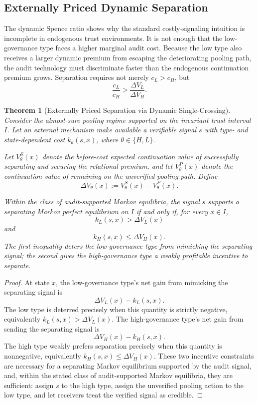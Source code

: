 \documentclass[preprint,authoryear]{elsarticle}
\newtheorem{theorem}{Theorem}
\theoremstyle{definition}
\theoremstyle{plain}
\begin{document}
\subsection{Externally Priced Dynamic Separation}
\label{subsec:dynamic-separation}

The dynamic Spence ratio shows why the standard costly-signaling intuition is
incomplete in endogenous trust environments.  It is not enough that the
low-governance type faces a higher marginal audit cost.  Because the low type
also receives a larger dynamic premium from escaping the deteriorating pooling
path, the audit technology must discriminate faster than the endogenous
continuation premium grows.  Separation requires not merely $c_L>c_H$, but
\[
\frac{c_L}{c_H}>
\frac{\Delta V_L}{\Delta V_H}.
\]

\begin{theorem}[Externally Priced Separation via Dynamic Single-Crossing]
\label{thm:externally-priced-dynamic-separation}
Consider the almost-sure pooling regime supported on the invariant trust
interval $I$. Let an external mechanism make available a verifiable signal
$s$ with type- and state-dependent cost $k_\theta(s,x)$, where
$\theta\in\{H,L\}$.

Let $V_\theta^S(x)$ denote the before-cost expected continuation value of
successfully separating and securing the relational premium, and let
$V_\theta^P(x)$ denote the continuation value of remaining on the unverified
pooling path. Define
\[
\Delta V_\theta(x)
:=
V_\theta^S(x)-V_\theta^P(x).
\]

Within the class of audit-supported Markov equilibria, the signal $s$
supports a separating Markov perfect equilibrium on $I$ if and only if, for
every $x\in I$,
\[
k_L(s,x)>\Delta V_L(x)
\]
and
\[
k_H(s,x)\le \Delta V_H(x).
\]
The first inequality deters the low-governance type from mimicking the
separating signal; the second gives the high-governance type a weakly
profitable incentive to separate.
\end{theorem}
\begin{proof}
At state $x$, the low-governance type's net gain from mimicking the
separating signal is
\[
\Delta V_L(x)-k_L(s,x).
\]
The low type is deterred precisely when this quantity is strictly negative,
equivalently $k_L(s,x)>\Delta V_L(x)$.  The high-governance type's net gain
from sending the separating signal is
\[
\Delta V_H(x)-k_H(s,x).
\]
The high type weakly prefers separation precisely when this quantity is
nonnegative, equivalently $k_H(s,x)\le\Delta V_H(x)$.  These two incentive
constraints are necessary for a separating Markov equilibrium supported by
the audit signal, and, within the stated class of audit-supported Markov
equilibria, they are sufficient: assign $s$ to the high type, assign the
unverified pooling action to the low type, and let receivers treat the
verified signal as credible.
\end{proof}
\end{document}
